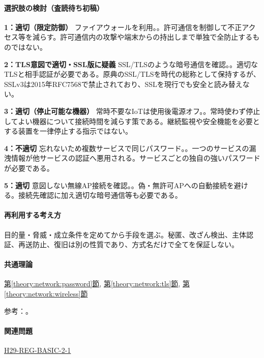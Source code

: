 \paragraph{選択肢の検討（査読待ち初稿）}\mbox{}\par

\noindent\textbf{1：適切（限定防御）} ファイアウォールを利用。。許可通信を制御して不正アクセス等を減らす。許可通信内の攻撃や端末からの持出しまで単独で全防止するものではない。\par

\noindent\textbf{2：TLS意図で適切・SSL版に疑義} SSL/TLSのような暗号通信を確認。。適切なTLSと相手認証が必要である。原典のSSL/TLSを時代の総称として保持するが、SSLv3は2015年RFC7568で禁止されており、SSLを現行でも安全と読み替えない。\par

\noindent\textbf{3：適切（停止可能な機器）} 常時不要なIoTは使用後電源オフ。。常時使わず停止してよい機器について接続時間を減らす策である。継続監視や安全機能を必要とする装置を一律停止する指示ではない。\par

\noindent\textbf{4：不適切} 忘れないため複数サービスで同じパスワード。。一つのサービスの漏洩情報が他サービスの認証へ悪用される。サービスごとの独自の強いパスワードが必要である。\par

\noindent\textbf{5：適切} 意図しない無線AP接続を確認。。偽・無許可APへの自動接続を避ける。接続先確認に加え適切な暗号通信等も必要である。\par

\paragraph{再利用する考え方} 目的量・脅威・成立条件を定めてから手段を選ぶ。秘匿、改ざん検出、主体認証、再送防止、復旧は別の性質であり、方式名だけで全てを保証しない。

\paragraph{共通理論} \hyperref[theory:network:password]{第\ref*{theory:network:password}節}, \hyperref[theory:network:tls]{第\ref*{theory:network:tls}節}, \hyperref[theory:network:wireless]{第\ref*{theory:network:wireless}節}

\par 参考：\cite{net_ssl2015,net_ipa_account,net_wep}。

\paragraph{関連問題} \hyperref[q:h29-reg-basic-2-1]{H29-REG-BASIC-2-1}

